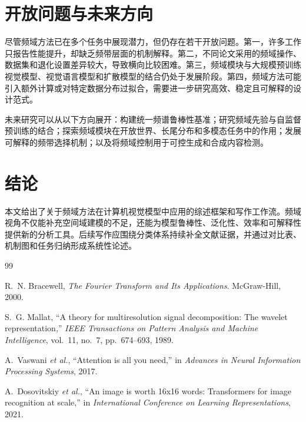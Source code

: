 \documentclass[journal,10pt]{IEEEtran}
\begin{document}
\section{开放问题与未来方向}
尽管频域方法已在多个任务中展现潜力，但仍存在若干开放问题。第一，许多工作只报告性能提升，却缺乏频带层面的机制解释。第二，不同论文采用的频域操作、数据集和退化设置差异较大，导致横向比较困难。第三，频域模块与大规模预训练视觉模型、视觉语言模型和扩散模型的结合仍处于发展阶段。第四，频域方法可能引入额外计算或对特定数据分布过拟合，需要进一步研究高效、稳定且可解释的设计范式。

未来研究可以从以下方向展开：构建统一频谱鲁棒性基准；研究频域先验与自监督预训练的结合；探索频域模块在开放世界、长尾分布和多模态任务中的作用；发展可解释的频带选择机制；以及将频域控制用于可控生成和合成内容检测。

\section{结论}
本文给出了关于频域方法在计算机视觉模型中应用的综述框架和写作工作流。频域视角不仅能补充空间域建模的不足，还能为模型鲁棒性、泛化性、效率和可解释性提供新的分析工具。后续写作应围绕分类体系持续补全文献证据，并通过对比表、机制图和任务归纳形成系统性论述。

\begin{thebibliography}{99}

R.~N. Bracewell, \emph{The Fourier Transform and Its Applications}. McGraw-Hill, 2000.

S.~G. Mallat, ``A theory for multiresolution signal decomposition: The wavelet representation,'' \emph{IEEE Transactions on Pattern Analysis and Machine Intelligence}, vol.~11, no.~7, pp.~674--693, 1989.

A.~Vaswani \emph{et al.}, ``Attention is all you need,'' in \emph{Advances in Neural Information Processing Systems}, 2017.

A.~Dosovitskiy \emph{et al.}, ``An image is worth 16x16 words: Transformers for image recognition at scale,'' in \emph{International Conference on Learning Representations}, 2021.

\end{thebibliography}
\end{document}
